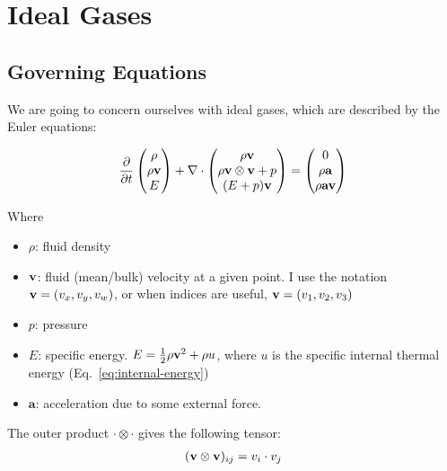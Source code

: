 \newpage
\section{Ideal Gases}\label{chap:ideal_gases}





\subsection{Governing Equations}

We are going to concern ourselves with ideal gases, which are described by the
Euler equations:


\begin{align}
	\frac{\partial}{\partial t}
	\begin{pmatrix}
		\rho \\
		\rho \mathbf{v} \\
		E
	\end{pmatrix}
	+
	\nabla \cdot
	\begin{pmatrix}
		\rho \mathbf{v}\\
		\rho \mathbf{v} \otimes \mathbf{v} + p\\
		(E + p) \mathbf{v}
	\end{pmatrix}
	=
	\begin{pmatrix}
		0\\
		\rho \mathbf{a}\\
		\rho \mathbf{a} \mathbf{v}
	\end{pmatrix}
\end{align}



Where
\begin{itemize}
\item $\rho$: fluid density
\item $\mathbf{v}$: fluid (mean/bulk) velocity at a given point. I use the notation
	$\mathbf{v} = (v_x, v_y, v_w)$, or when indices are useful, $\mathbf{v} = (v_1, v_2, v_3)$
\item $p$: pressure
\item $E$: specific energy. $E = \frac{1}{2} \rho \mathbf{v}^2 + \rho u$,
	where $u$ is the specific internal thermal energy
	(Eq.~\ref{eq:internal-energy})
\item $\mathbf{a}$: acceleration due to some external force.
\end{itemize}

The outer product $\cdot \otimes \cdot$ gives the following tensor:
\begin{align}
	(\mathbf{v} \otimes \mathbf{v})_{ij} = v_i \cdot v_j
\end{align}



